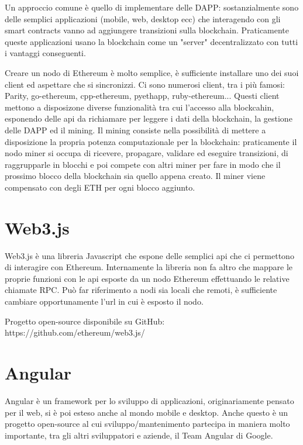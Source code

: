 \vspace{0.5cm}

Un approccio comune è quello di implementare delle DAPP: sostanzialmente sono delle semplici applicazioni (mobile, web, desktop ecc) che interagendo con gli smart contracts vanno ad aggiungere transizioni sulla blockchain.
Praticamente queste applicazioni usano la blockchain come un "server" decentralizzato con tutti i vantaggi conseguenti.

\vspace{0.5cm}

Creare un nodo di Ethereum è molto semplice, è sufficiente installare uno dei suoi client ed aspettare che si sincronizzi. Ci sono numerosi client, tra i più famosi: Parity, go-ethereum, cpp-ethereum, pyethapp, ruby-ethereum...
Questi client mettono a disposizone diverse funzionalità tra cui l'accesso alla blockcahin, esponendo delle api da richiamare per leggere i dati della blockchain, la gestione delle DAPP ed il mining.
Il mining consiste nella possibilità di mettere a disposizione la propria potenza computazionale per la blockchain: praticamente il nodo miner si occupa di ricevere, propagare, validare ed eseguire transizioni, di raggrupparle in blocchi e poi compete con altri miner per fare in modo che il prossimo blocco della blockchain sia quello appena creato. Il miner viene compensato con degli ETH per ogni blocco aggiunto.

\section{Web3.js}
Web3.js è una libreria Javascript che espone delle semplici api che ci permettono di interagire con Ethereum.
Internamente la libreria non fa altro che mappare le proprie funzioni con le api esposte da un nodo Ethereum effettuando le relative chiamate RPC.
Può far riferimento a nodi sia locali che remoti, è sufficiente cambiare opportunamente l'url in cui è esposto il nodo.

Progetto open-source disponibile su GitHub:
https://github.com/ethereum/web3.js/


\section{Angular}

Angular è un framework per lo sviluppo di applicazioni, originariamente pensato per il web, si è poi esteso anche al mondo mobile e desktop.
Anche questo è un progetto open-source al cui sviluppo/mantenimento partecipa in maniera molto importante, tra gli altri sviluppatori e aziende, il Team Angular di Google.

